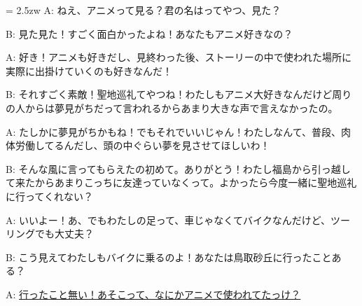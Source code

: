 \documentclass[11pt]{amsart}
\title{}
\author{}
\newenvironment{hangall}[1]{\hangindent = 2.5zw\everypar{\hangindent = 2.5zw}}{}
\begin{document}
\maketitle
\begin{hangall}{}%
A: ねえ、アニメって見る？君の名はってやつ、見た？

B: 見た見た！すごく面白かったよね！あなたもアニメ好きなの？

A: 好き！アニメも好きだし、見終わった後、ストーリーの中で使われた場所に実際に出掛けていくのも好きなんだ！

B: それすごく素敵！聖地巡礼てやつね！わたしもアニメ大好きなんだけど周りの人からは夢見がちだって言われるからあまり大きな声で言えなかったの。

A: たしかに夢見がちかもね！でもそれでいいじゃん！わたしなんて、普段、肉体労働してるんだし、頭の中ぐらい夢を見させてほしいわ！

B: そんな風に言ってもらえたの初めて。ありがとう！わたし福島から引っ越して来たからあまりこっちに友達っていなくって。よかったら今度一緒に聖地巡礼に行ってくれない？

A: いいよー！あ、でもわたしの足って、車じゃなくてバイクなんだけど、ツーリングでも大丈夫？

B: こう見えてわたしもバイクに乗るのよ！あなたは鳥取砂丘に行ったことある？

A: \ul{行ったこと無い！あそこって、なにかアニメで使われてたっけ？}\end{hangall}
\end{document}
